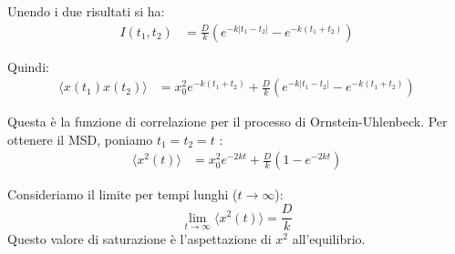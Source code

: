 Unendo i due risultati si ha:
\begin{equation}
\begin{aligned}
I(t_1, t_2) &= \frac{D}{k}  (e^{-k|t_1-t_2|} - e^{-k( t_1+t_2)}  )
\end{aligned}
\end{equation}

Quindi:
\begin{equation}
\begin{aligned}
\langle x(t_1) x(t_2) \rangle &= x_0^2  e^{-k(t_1+t_2)} + \frac{D}{k}  (e^{-k|t_1-t_2|} - e^{-k( t_1+t_2)}  ) 
\end{aligned}
\end{equation}

Questa è la funzione di correlazione per il processo di Ornstein-Uhlenbeck.
Per ottenere il MSD, poniamo $t_1=t_2=t$ :
\begin{equation}
\begin{aligned}
\langle x^2(t) \rangle &=   x_0^2  e^{-2k t} + \frac{D}{k} \left( 1 - e^{-2kt} \right)
\end{aligned}
\end{equation}

Consideriamo il limite per tempi lunghi ($t \to \infty$):
\begin{equation}
\lim_{t\to\infty} \langle x^2(t) \rangle = \frac{D}{k}
\end{equation}
Questo valore di saturazione è l'aspettazione di $x^2$ all'equilibrio.